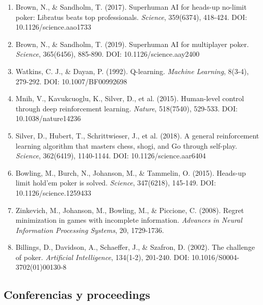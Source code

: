 \documentclass[12pt,a4paper]{article}
\begin{document}
\begin{enumerate}
    \item Brown, N., \& Sandholm, T. (2017). Superhuman AI for heads-up no-limit poker: Libratus beats top professionals. \textit{Science}, 359(6374), 418-424. DOI: 10.1126/science.aao1733
    
    \item Brown, N., \& Sandholm, T. (2019). Superhuman AI for multiplayer poker. \textit{Science}, 365(6456), 885-890. DOI: 10.1126/science.aay2400
    
    \item Watkins, C. J., \& Dayan, P. (1992). Q-learning. \textit{Machine Learning}, 8(3-4), 279-292. DOI: 10.1007/BF00992698
    
    \item Mnih, V., Kavukcuoglu, K., Silver, D., et al. (2015). Human-level control through deep reinforcement learning. \textit{Nature}, 518(7540), 529-533. DOI: 10.1038/nature14236
    
    \item Silver, D., Hubert, T., Schrittwieser, J., et al. (2018). A general reinforcement learning algorithm that masters chess, shogi, and Go through self-play. \textit{Science}, 362(6419), 1140-1144. DOI: 10.1126/science.aar6404
    
    \item Bowling, M., Burch, N., Johanson, M., \& Tammelin, O. (2015). Heads-up limit hold'em poker is solved. \textit{Science}, 347(6218), 145-149. DOI: 10.1126/science.1259433
    
    \item Zinkevich, M., Johanson, M., Bowling, M., \& Piccione, C. (2008). Regret minimization in games with incomplete information. \textit{Advances in Neural Information Processing Systems}, 20, 1729-1736.
    
    \item Billings, D., Davidson, A., Schaeffer, J., \& Szafron, D. (2002). The challenge of poker. \textit{Artificial Intelligence}, 134(1-2), 201-240. DOI: 10.1016/S0004-3702(01)00130-8
\end{enumerate}

\subsection{Conferencias y proceedings}
\end{document}
